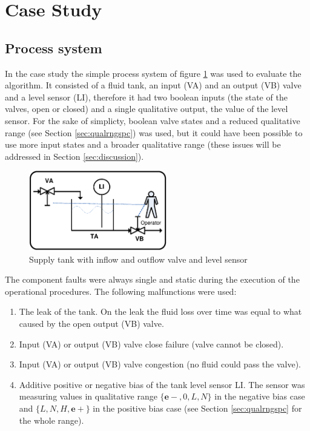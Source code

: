 \documentclass[conference]{IEEEtran}
\begin{document}
\section{Case Study}

\subsection{Process system}
\label{sec:procsys}

In the case study the simple process system of figure \ref{fig:tank} was used to evaluate the algorithm. It consisted of a fluid tank, an input (VA) and an output (VB) valve and a level sensor (LI), therefore it had two boolean inputs (the state of the valves, open or closed) and a single qualitative output, the value of the level sensor. For the sake of simplicty, boolean valve states and a reduced qualitative range (see Section \ref{sec:qualrngspc}) was used, but it could have been possible to use more input states and a broader qualitative range (these issues will be addressed in Section \ref{sec:discussion}). 

\begin{figure}[h!]
 \begin{center}
  \includegraphics[width=6cm]{Stank.eps}
  \caption {Supply tank with inflow and outflow valve and level sensor}
  \label{fig:tank}
 \end{center}
\end{figure} 

The component faults were always single and static during the execution of the operational procedures. The following malfunctions were used:
\begin{enumerate}
\item The leak of the tank. On the leak the fluid loss over time was equal to what caused by the open output (VB) valve.
\item Input (VA) or output (VB) valve close failure (valve cannot be closed).
\item Input (VA) or output (VB) valve congestion (no fluid could pass the valve).
\item Additive positive or negative bias of the tank level sensor LI. The sensor was measuring values in qualitative range $\{\mathbf{e-},0,L,N\}$ in the negative bias case and $\{L,N,H,\mathbf{e+}\}$ in the positive bias case (see Section \ref{sec:qualrngspc} for the whole range).
\end{enumerate}
\end{document}
